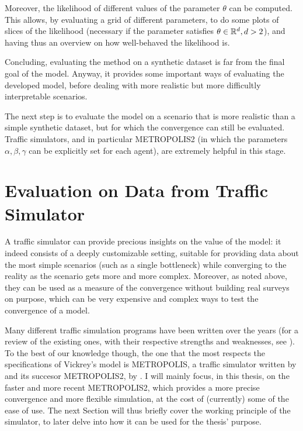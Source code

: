 Moreover, the likelihood of different values of the parameter \(\theta\) can be computed.
This allows, by evaluating a grid of different parameters,
to do some plots of slices of the likelihood (necessary if the parameter satisfies \(\theta \in \mathbb{R}^d, d > 2\)),
and having thus an overview on how well-behaved the likelihood is.

Concluding, evaluating the method on a synthetic dataset is far from the final goal of the model.
Anyway, it provides some important ways of evaluating the developed model,
before dealing with more realistic but more difficultly interpretable scenarios.

The next step is to evaluate the model on a scenario that is more realistic than a simple synthetic dataset,
but for which the convergence can still be evaluated.
Traffic simulators, and in particular METROPOLIS2 (in which the parameters \(\alpha, \beta, \gamma\) can be explicitly set for each agent),
are extremely helpful in this stage.

\section{Evaluation on Data from Traffic Simulator}
\label{sec:eval_metr}

A traffic simulator can provide precious insights on the value of the model:
it indeed consists of a deeply customizable setting,
suitable for providing data about the most simple scenarios (such as a single bottleneck)
while converging to the reality as the scenario gets more and more complex.
Moreover, as noted above,
they can be used as a measure of the convergence without building real surveys on purpose,
which can be very expensive and complex ways to test the convergence of a model.

Many different traffic simulation programs have been written over the years
(for a review of the existing ones, with their respective strengths and weaknesses, see \cite{NGUYEN2021100486}).
To the best of our knowledge though,
the one that the most respects the specifications of Vickrey's model \parencite{LI2020311} is METROPOLIS,
a traffic simulator written by \textcite{de1997metropolis} and its succesor METROPOLIS2, by \textcite{RePEc:ema:worpap:2024-03}.
I will mainly focus, in this thesis,
on the faster and more recent METROPOLIS2,
which provides a more precise convergence and more flexible simulation,
at the cost of (currently) some of the ease of use.
The next Section will thus briefly cover the working principle of the simulator,
to later delve into how it can be used for the thesis' purpose.

